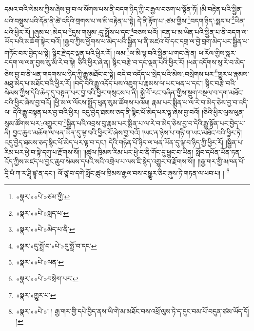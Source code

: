 དམའ་བའི་སེམས་ཀྱིས་ཞེས་བྱ་བ་ལ་སོགས་པས་ནི་བདག་ཉིད་ཀྱི་ང་རྒྱལ་བཅག་པ་སྟོན་ཏོ། །མི་བརྟེན་པའི་སྦྱིན་པའི་བསྡུས་པའི་དོན་ནི་ཚེ་འདིའི་གྲགས་པ་ལ་མི་བརྟེན་པ་སྟེ། དེ་ནི་རྟོག་པ་:ཙམ་གྱིས་\footnote{«སྣར་»«པེ་»ཙམ་གྱི་}བདག་ཉིད་:སྨད་པ་\footnote{«སྣར་»«པེ་»སླད་པ་}ཡིན་པའི་ཕྱིར་རོ། །ཞུམ་པ་:མེད་པ་\footnote{«སྣར་»«པེ་»མེད་པ་ནི་}དུས་གསུམ་:དུ་སྤྲོས་པ་དང་\footnote{«སྣར་»དུ་སྤྲོ་བ་«པེ་»དུ་སྤྲོ་བ་དང་}བཅས་པའོ། །ངན་པ་མ་ཡིན་པའི་སྦྱིན་པ་ནི་བདག་ལ་ཡོད་པའི་མཆོག་སྟེར་བའོ། །རྒྱབ་ཀྱིས་ཕྱོགས་པ་མེད་པའི་སྦྱིན་པ་ནི་མཛའ་བོ་དང་དགྲ་ལ་བྱེ་བྲག་མེད་པར་སྦྱིན་པ་གཏོང་བར་བྱེད་པ་སྟེ། སྙིང་རྗེ་དང་ལྡན་པའི་ཕྱིར་རོ། །ལམ་\footnote{«སྣར་»«པེ་»ལན་}ལ་མི་ལྟ་བའི་སྦྱིན་པ་གང་ཞེ་ན། ཕ་རོལ་གྱིས་སླར་བདག་ལ་ལན་བྱས་སུ་མི་རེ་བ་སྟེ། ཅིའི་ཕྱིར་ཞེ་ན། སྙིང་བརྩེ་བ་དང་ལྡན་པའི་ཕྱིར་རོ། །ཕན་འདོགས་སུ་རེ་བ་མེད་ཅེས་བྱ་བ་ནི་ཕན་གདགས་པ་ཉིད་ཀྱི་རྒྱུ་མཐོང་བ་སྟེ། བདེ་བ་འདོད་པ་སྲེད་པའི་མེས་:བསྲེགས་པར་\footnote{«སྣར་»«པེ་»བསྲེག་པར་}གྱུར་པ་རྣམས་མཐུ་མེད་པ་མཐོང་བའི་ཕྱིར་རོ། །བདེ་བའི་རྒྱུ་འདོད་པས་འཇུག་པ་རྣམས་ལ་ཡང་ཕན་པ་དང་། སྙིང་བརྩེ་བའི་སེམས་ཀྱིས་དེའི་ཆེད་དུ་བསྟན་པར་བྱ་བའི་ཕྱིར་གསུངས་པ་ནི། སྐྱེ་བོ་རང་བཞིན་གྱིས་སྡུག་བསྔལ་བ་དག་མཐོང་བའི་ཕྱིར་ཞེས་བྱ་བའོ། །ཕྱི་མ་ལ་ལོངས་སྤྱོད་ཕུན་སུམ་ཚོགས་པའམ། རྣམ་པར་སྨིན་པ་ལ་རེ་བ་མེད་ཅེས་བྱ་བ་འདི་ལ། དེའི་རྒྱུ་བསྟན་པར་བྱ་བའི་ཕྱིར། འདུ་བྱེད་ཐམས་ཅད་ནི་སྙིང་པོ་མེད་པར་ལྟ་ཞེས་བྱ་བའོ། །ཅིའི་ཕྱིར་ལུས་ཕུན་སུམ་ཚོགས་པར་:འགྱུར་བ་\footnote{«སྣར་»གྱུར་པ་}སྦྱིན་པའི་འབྲས་བུ་རྣམ་པར་སྨིན་པ་ལ་རེ་བ་མེད་ཅེས་བྱ་བ་དེའི་རྒྱུ་སྟོན་པར་བྱེད་པ་ནི། བྱང་ཆུབ་མཆོག་ལ་ཕན་ཡོན་དུ་ལྟ་བའི་ཕྱིར་རོ་ཞེས་བྱ་བའོ། །ཡང་ན་ཉེས་པ་གཉི་ག་ཡང་མཐོང་བའི་ཕྱིར་ཏེ། འདུ་བྱེད་ཐམས་ཅད་སྙིང་པོ་མེད་པར་ལྟ་བ་དང་། དེའི་གཉེན་པོ་ཉིད་ལ་ཕན་ཡོན་དུ་ལྟ་བ་ཉིད་ཀྱི་ཕྱིར་རོ། །སྦྱིན་པ་རིམ་པར་ཕྱེ་བ་སྟེ་དགུ་པ་རྫོགས་སོ།། །།ཚུལ་ཁྲིམས་རིམ་པར་ཕྱེ་བ་ནི་གོང་དུ་ཕྱུང་བ་ཡིན། སློབ་དཔོན་ཡོན་ཏན་འོད་ཀྱིས་མཛད་པ་བྱང་ཆུབ་སེམས་དཔའི་སའི་འགྲེལ་པ་ལས་ཇི་སྙེད་འགྱུར་བ་རྫོགས་སོ།། །།རྒྱ་གར་གྱི་མཁན་པོ་དཱི་པཾ་ཀ་ར་ཤྲཱི་ཛྙཱ་ན་དང་། ལོ་ཙཱ་བ་དགེ་སློང་ཚུལ་ཁྲིམས་རྒྱལ་བས་བསྒྱུར་ཅིང་ཞུས་ཏེ་གཏན་ལ་ཕབ་པ། ། \footnote{«སྣར་»«པེ་»། ། རྒྱ་གར་གྱི་དཔེ་བྱིད་ནས་ཡི་གེ་མ་མཐོང་བས་འཕྲོ་ལུས་ཏེ་ད་དུང་བམ་པོ་བདུན་ཙམ་ཡོད་དོ། །}
